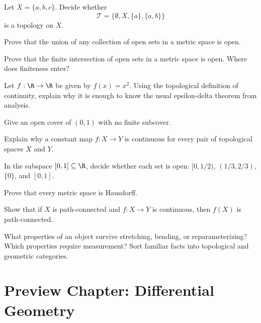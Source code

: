 \begin{exercise}
Let $X=\{a,b,c\}$. Decide whether
\[
\mathcal{T}=\{\emptyset,X,\{a\},\{a,b\}\}
\]
is a topology on $X$.
\end{exercise}

\begin{exercise}
Prove that the union of any collection of open sets in a metric space is open.
\end{exercise}

\begin{exercise}
Prove that the finite intersection of open sets in a metric space is open.
Where does finiteness enter?
\end{exercise}

\begin{exercise}
Let $f:\R\to\R$ be given by $f(x)=x^2$. Using the topological definition of
continuity, explain why it is enough to know the usual epsilon-delta theorem
from analysis.
\end{exercise}

\begin{exercise}
Give an open cover of $(0,1)$ with no finite subcover.
\end{exercise}

\begin{exercise}
Explain why a constant map $f:X\to Y$ is continuous for every pair of
topological spaces $X$ and $Y$.
\end{exercise}

\begin{exercise}
In the subspace $[0,1]\subseteq\R$, decide whether each set is open:
$[0,1/2)$, $(1/3,2/3)$, $\{0\}$, and $[0,1]$.
\end{exercise}

\begin{exercise}
Prove that every metric space is Hausdorff.
\end{exercise}

\begin{exercise}
Show that if $X$ is path-connected and $f:X\to Y$ is continuous, then $f(X)$
is path-connected.
\end{exercise}

\begin{walkbox}
What properties of an object survive stretching, bending, or reparameterizing?
Which properties require measurement? Sort familiar facts into topological and
geometric categories.
\end{walkbox}

\section{Preview Chapter: Differential Geometry}

